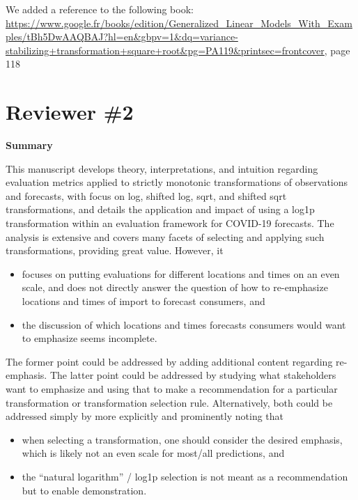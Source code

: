 \documentclass{article}
\newcommand{\red}{\color{red}}
\newcommand{\black}{\color{black}}
\begin{document}
\black
We added a reference to the following book:  \url{https://www.google.fr/books/edition/Generalized_Linear_Models_With_Examples/tBh5DwAAQBAJ?hl=en&gbpv=1&dq=variance-stabilizing+transformation+square+root&pg=PA119&printsec=frontcover}, page 118










\red
\section{Reviewer \#2}

\textbf{Summary}

This manuscript develops theory, interpretations, and intuition regarding evaluation metrics applied to strictly monotonic transformations of observations and forecasts, with focus on log, shifted log, sqrt, and shifted sqrt transformations, and details the application and impact of using a log1p transformation within an evaluation framework for COVID-19 forecasts.
The analysis is extensive and covers many facets of selecting and applying such transformations, providing great value. However, it
\begin{itemize}
    \item focuses on putting evaluations for different locations and times on an even scale, and does not directly answer the question of how to re-emphasize locations and times of import to forecast consumers, and
    \item the discussion of which locations and times forecasts consumers would want to emphasize seems incomplete.
\end{itemize}
The former point could be addressed by adding additional content regarding re-emphasis. The latter point could be addressed by studying what stakeholders want to emphasize and using that to make a recommendation for a particular transformation or transformation selection rule. Alternatively, both could be addressed simply by more explicitly and prominently noting that
\begin{itemize}
    \item when selecting a transformation, one should consider the desired emphasis, which is likely not an even scale for most/all predictions, and
    \item the “natural logarithm” / log1p selection is not meant as a recommendation but to enable demonstration.
\end{itemize}
\end{document}
